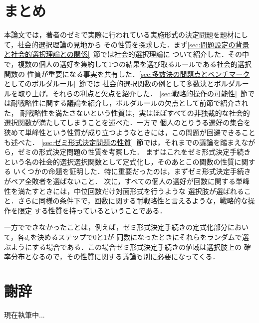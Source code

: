 \documentclass[dvipdfmx]{jsarticle}
\begin{document}
\section{まとめ}
本論文では，著者のゼミで実際に行われている実施形式の決定問題を題材にして，社会的選択理論の見地から
その性質を探求した．まず\ref{sec:問題設定の背景と社会的選択理論との関係}~節では社会的選択理論に
ついて紹介した．その中で，複数の個人の選好を集約して$1$つの結果を選び取るルールである社会的選択関数の
性質が重要になる事実を共有した．\ref{sec:多数決の問題点とベンチマークとしてのボルダルール}~節では
社会的選択関数の例として多数決とボルダルールを取り上げ，それらの利点と欠点を紹介した．
\ref{sec:戦略的操作の可能性}~節では耐戦略性に関する議論を紹介し，ボルダルールの欠点として前節で紹介された，
耐戦略性を満たさないという性質は，実はほぼすべての非独裁的な社会的選択関数が満たしてしまうことを述べた．一方で
個人のとりうる選好の集合を狭めて単峰性という性質が成り立つようなときには，この問題が回避できることも述べた．
\ref{sec:ゼミ形式決定問題の性質}~節では，それまでの議論を踏まえながら，ゼミの形式決定問題の性質を考察した．
まずはこれをゼミ形式決定手続きという名の社会的選択選択関数として定式化し，そのあとこの関数の性質に関する
いくつかの命題を証明した．特に重要だったのは，まずゼミ形式決定手続きがペア全敗者を選ばないこと．
次に，すべての個人の選好が回数に関する単峰性を満たすときには，中位回数だけ対面形式を行うような
選択肢が選ばれること．さらに同様の条件下で，回数に関する耐戦略性と言えるような，戦略的な操作を限定
する性質を持っているということである．

一方でできなかったことは，例えば，ゼミ形式決定手続きの定式化部分において，各$d_i$を決めるステップで$0$と$1$が
同数になったときにそれらをランダムで選ぶようにする場合である．この場合ゼミ形式決定手続きの値域は選択肢上の
確率分布となるので，その性質に関する議論も別に必要になってくる．

\newpage
\section*{謝辞}
現在執筆中...
\end{document}
